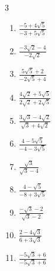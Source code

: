\begin{multicols}{3}
\begin{enumerate}
  \item $\displaystyle \frac{-5+4\sqrt{5}}{-3+5\sqrt{5}}$


  \item $\displaystyle \frac{-3\sqrt{2}-4}{-2\sqrt{2}}$


  \item $\displaystyle \frac{5\sqrt{5}+2}{-2\sqrt{5}+4}$


  \item $\displaystyle \frac{4\sqrt{2}+5\sqrt{5}}{2\sqrt{2}+2\sqrt{5}}$


\columnbreak %

  \item $\displaystyle \frac{3\sqrt{3}-4\sqrt{2}}{\sqrt{3}+4\sqrt{2}}$


  \item $\displaystyle \frac{4-5\sqrt{5}}{-4-3\sqrt{5}}$


  \item $\displaystyle \frac{\sqrt{3}}{\sqrt{3}-4}$


  \item $\displaystyle \frac{4-\sqrt{5}}{-8+3\sqrt{5}}$


  \item $\displaystyle \frac{-\sqrt{3}-2}{\sqrt{3}-2}$


\columnbreak %

  \item $\displaystyle \frac{2-4\sqrt{3}}{6+3\sqrt{3}}$


  \item $\displaystyle \frac{-5\sqrt{3}+6}{-5\sqrt{3}+6}$


\end{enumerate}
\end{multicols}
